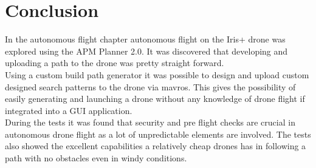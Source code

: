 \chapter{Conclusion}

In the autonomous flight chapter autonomous flight on the Iris+ drone was explored using the APM Planner 2.0. It was discovered that developing and uploading a path to the drone was pretty straight forward.\\

Using a custom build path generator it was possible to design and upload custom designed search patterns to the drone via mavros. This gives the possibility of easily generating and launching a drone without any knowledge of drone flight if integrated into a GUI application.\\

During the tests it was found that security and pre flight checks are crucial in autonomous drone flight as a lot of unpredictable elements are involved. The tests also showed the excellent capabilities a relatively cheap drones has in following a path with no obstacles even in windy conditions.\\

\newpage
